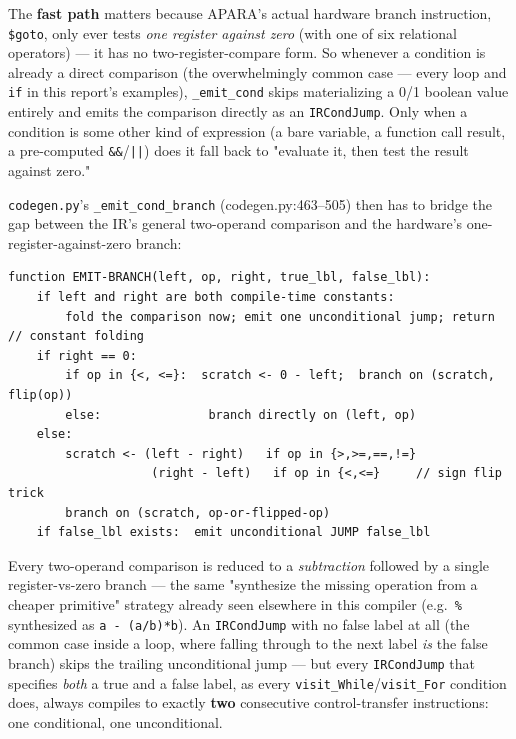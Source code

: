\documentclass[11pt,a4paper]{article}
\begin{document}
The \textbf{fast path} matters because APARA's actual hardware branch instruction,
\texttt{\$goto}, only ever tests \emph{one register against zero} (with one of six
relational operators) --- it has no two-register-compare form. So whenever a condition is
already a direct comparison (the overwhelmingly common case --- every loop and \texttt{if}
in this report's examples), \texttt{\_emit\_cond} skips materializing a 0/1 boolean value
entirely and emits the comparison directly as an \texttt{IRCondJump}. Only when a condition
is some other kind of expression (a bare variable, a function call result, a pre-computed
\texttt{\&\&}/\texttt{||}) does it fall back to "evaluate it, then test the result against
zero."

\texttt{codegen.py}'s \texttt{\_emit\_cond\_branch} (codegen.py:463--505) then has to bridge
the gap between the IR's general two-operand comparison and the hardware's
one-register-against-zero branch:
\begin{lstlisting}[style=pseudostyle, caption={\texttt{\_emit\_cond\_branch}, codegen.py:463--505 (essence)}]
function EMIT-BRANCH(left, op, right, true_lbl, false_lbl):
    if left and right are both compile-time constants:
        fold the comparison now; emit one unconditional jump; return    // constant folding
    if right == 0:
        if op in {<, <=}:  scratch <- 0 - left;  branch on (scratch, flip(op))
        else:               branch directly on (left, op)
    else:
        scratch <- (left - right)   if op in {>,>=,==,!=}
                    (right - left)   if op in {<,<=}     // sign flip trick
        branch on (scratch, op-or-flipped-op)
    if false_lbl exists:  emit unconditional JUMP false_lbl
\end{lstlisting}
Every two-operand comparison is reduced to a \emph{subtraction} followed by a single
register-vs-zero branch --- the same "synthesize the missing operation from a cheaper
primitive" strategy already seen elsewhere in this compiler (e.g.\ \texttt{\%} synthesized
as \texttt{a - (a/b)*b}). An \texttt{IRCondJump} with no false label at all (the common
case inside a loop, where falling through to the next label \emph{is} the false branch)
skips the trailing unconditional jump --- but every \texttt{IRCondJump} that specifies
\emph{both} a true and a false label, as every \texttt{visit\_While}/\texttt{visit\_For}
condition does, always compiles to exactly \textbf{two} consecutive control-transfer
instructions: one conditional, one unconditional.

\end{document}
